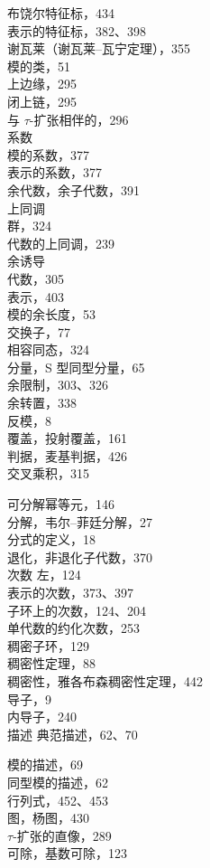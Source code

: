 布饶尔特征标，434\\
表示的特征标，382、398\\
谢瓦莱（谢瓦莱–瓦宁定理），355\\
模的类，51\\
上边缘，295\\
闭上链，295\\
与 \(\tau\)-扩张相伴的，296\\
系数\\
模的系数，377\\
表示的系数，377\\
余代数，余子代数，391\\
上同调\\
群，324\\
代数的上同调，239\\
余诱导\\
代数，305\\
表示，403\\
模的余长度，53\\
交换子，77\\
相容同态，324\\
分量，S 型同型分量，65\\
余限制，303、326\\
余转置，338\\
反模，8\\
覆盖，投射覆盖，161\\
判据，麦基判据，426\\
交叉乘积，315


可分解幂等元，146\\
分解，韦尔–菲廷分解，27\\
分式的定义，18\\
退化，非退化子代数，370\\
次数 左，124\\
表示的次数，373、397\\
子环上的次数，124、204\\
单代数的约化次数，253\\
稠密子环，129\\
稠密性定理，88\\
稠密性，雅各布森稠密性定理，442\\
导子，9\\
内导子，240\\
描述 典范描述，62、70

模的描述，69\\
同型模的描述，62\\
行列式，452、453\\
图，杨图，430\\
\(\tau\)-扩张的直像，289\\
可除，基数可除，123

